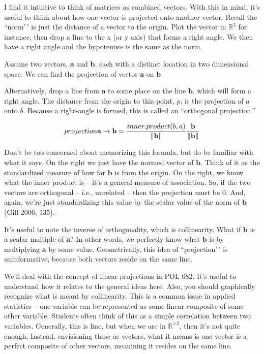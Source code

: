 \documentclass[
]{book}
\begin{document}
I find it intuitive to think of matrices as combined vectors. With this
in mind, it's useful to think about how one vector is projected onto
another vector. Recall the ``norm'\,' is just the distance of a vector
to the origin. Plot the vector in \(\mathbb{R}^2\) for instance, then drop a line
to the x (or y axis) that forms a right angle. We then have a right
angle and the hypotenuse is the same as the norm.

Assume two vectors, \(\textbf{a}\) and \(\textbf{b}\), each with a
distinct location in two dimensional space. We can find the projection
of vector \(\textbf{a}\) on \(\textbf{b}\)

Alternatively, drop a line from \(\textbf{a}\) to some place on the line
\(\textbf{b}\), which will form a right angle. The distance from the
origin to this point, \(p\), is the projection of \(a\) onto \(b\). Because a
right-angle is formed, this is called an ``orthogonal projection.''

\[projection \textbf{a} \rightarrow \textbf{b}={{inner.product(b,a)}\over{\|\textbf{b}\|}}{\textbf{b}\over{\|\textbf{b}\|}}\]

Don't be too concerned about memorizing this formula, but do be familiar
with what it says. On the right we just have the normed vector of
\(\textbf{b}\). Think of it as the standardized measure of how far
\(\textbf{b}\) is from the origin. On the right, we know what the inner
product is -- it's a general measure of association. So, if the two
vectors are orthogonal -- i.e., unrelated -- then the projection must be
0. And, again, we're just standardizing this value by the scalar value
of the norm of \(\textbf{b}\) (Gill 2006, 135).

It's useful to note the inverse of orthogonality, which is collinearity.
What if \(\textbf{b}\) is a scalar multiple of \(\textbf{a}\)? In other
words, we perfectly know what \(\textbf{b}\) is by multiplying
\(\textbf{a}\) by some value. Geometrically, this idea of ``projection'\,'
is uninformative, because both vectors reside on the same line.

We'll deal with the concept of linear projections in POL 682. It's
useful to understand how it relates to the general ideas here. Also, you
should graphically recognize what is meant by collinearity. This
is a common issue in applied statistics -- one variable can be
represented as some linear composite of some other variable. Students
often think of this as a simple correlation between two variables.
Generally, this is fine, but when we are in \(\mathbb{R}^{+2}\), then it's not
quite enough. Instead, envisioning these as vectors, what it means is
one vector is a perfect composite of other vectors, meanining it resides
on the same line.
\end{document}

